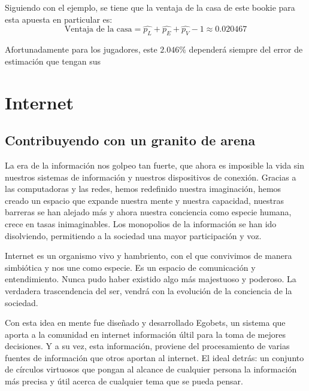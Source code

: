 Siguiendo con el ejemplo, se tiene que la ventaja de la casa de este bookie para esta apuesta en particular es:
\[\text{Ventaja de la casa} = \hat{p_L} + \hat{p_E} + \hat{p_V} - 1 \approx 0.020467\]

Afortunadamente para los jugadores, este $2.046\%$ dependerá siempre del error de estimación que tengan sus 



\section{Internet}
\subsection{Contribuyendo con un granito de arena}
La era de la información nos golpeo tan fuerte, que ahora es imposible la vida sin nuestros sistemas de información y nuestros dispositivos de conexión. Gracias a las computadoras y las redes, hemos redefinido nuestra imaginación, hemos creado un espacio que expande nuestra mente y nuestra capacidad, nuestras barreras se han alejado más y ahora nuestra conciencia como especie humana, crece en tasas inimaginables. Los monopolios de la información se han ido disolviendo, permitiendo a la sociedad una mayor participación y voz.

Internet es un organismo vivo y hambriento, con el que convivimos de manera simbiótica y nos une como especie. Es un espacio de comunicación y entendimiento. Nunca pudo haber existido algo más majestuoso y poderoso. La verdadera trascendencia del ser, vendrá con la evolución de la conciencia de la sociedad.

Con esta idea en mente fue diseñado y desarrollado Egobets, un sistema que aporta a la comunidad en internet información últil para la toma de mejores decisiones. Y a su vez, esta información, proviene del procesamiento de varias fuentes de información que otros aportan al internet. El ideal detrás: un conjunto de círculos virtuosos que pongan al alcance de cualquier persona la información más precisa y útil acerca de cualquier tema que se pueda pensar.

